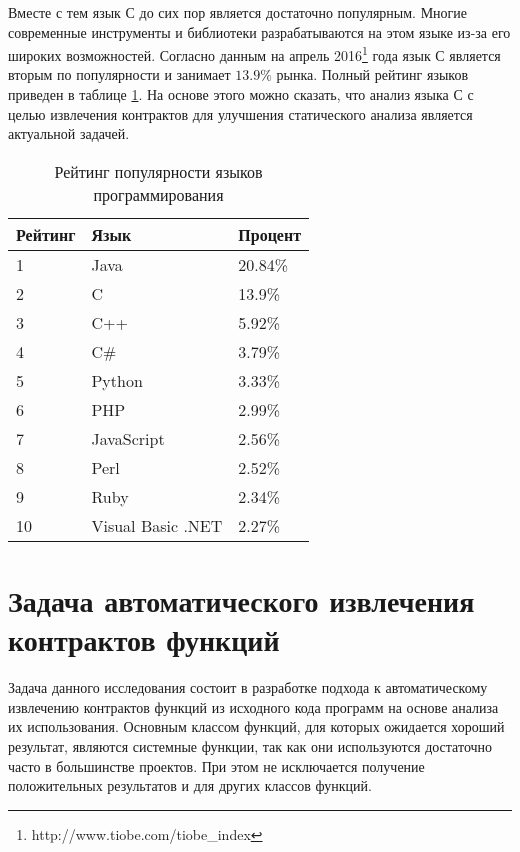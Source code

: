 Вместе с тем язык С до сих пор является достаточно популярным. Многие современные инструменты и библиотеки разрабатываются на этом языке из-за его широких возможностей. Согласно данным на апрель 2016\footnote{http://www.tiobe.com/tiobe\_index} года язык С является вторым по популярности и занимает $13.9\%$ рынка. Полный рейтинг языков приведен в таблице \ref{table:languages}. На основе этого можно сказать, что анализ языка С с целью извлечения контрактов для улучшения статического анализа является актуальной задачей.

\begin{table}
	\caption{Рейтинг популярности языков программирования}
	\begin{center}
	\begin{tabular}{|l|l|l|}
	\hline 
	\textbf{Рейтинг} & \textbf{Язык} & \textbf{Процент}	\\ 
	\hline 
	1 & Java & 20.84\% \\ 
	\hline 
	2 & C & 13.9\% \\ 
	\hline 
	3 & C++ & 5.92\% \\ 
	\hline 
	4 & C\# & 3.79\% \\ 
	\hline 
	5 & Python & 3.33\% \\ 
	\hline 
	6 & PHP & 2.99\% \\ 
	\hline 
	7 & JavaScript & 2.56\% \\ 
	\hline 
	8 & Perl & 2.52\% \\ 
	\hline 
	9 & Ruby & 2.34\% \\ 
	\hline 
	10 & Visual Basic .NET & 2.27\% \\ 
	\hline 
	\end{tabular} 
	\end{center}
	\label{table:languages}
\end{table}

\section{Задача автоматического извлечения контрактов функций}
Задача данного исследования состоит в разработке подхода к автоматическому извлечению контрактов функций из исходного кода программ на основе анализа их  использования. Основным классом функций, для которых ожидается хороший результат, являются системные функции, так как они используются достаточно часто в большинстве проектов. При этом не исключается получение положительных результатов и для других классов функций. 

